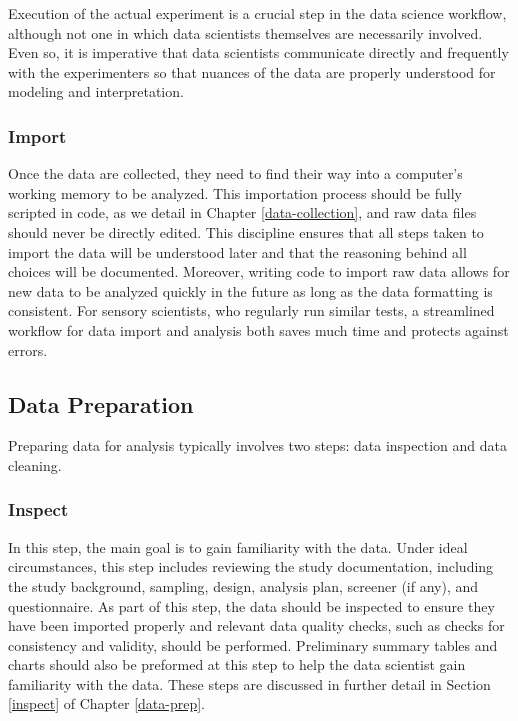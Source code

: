 \documentclass[
]{book}
\begin{document}
Execution of the actual experiment is a crucial step in the data science workflow, although not one in which data scientists themselves are necessarily involved. Even so, it is imperative that data scientists communicate directly and frequently with the experimenters so that nuances of the data are properly understood for modeling and interpretation.

\hypertarget{import}{%
\subsubsection{Import}\label{import}}

Once the data are collected, they need to find their way into a computer's working memory to be analyzed. This importation process should be fully scripted in code, as we detail in Chapter \ref{data-collection}, and raw data files should never be directly edited. This discipline ensures that all steps taken to import the data will be understood later and that the reasoning behind all choices will be documented. Moreover, writing code to import raw data allows for new data to be analyzed quickly in the future as long as the data formatting is consistent. For sensory scientists, who regularly run similar tests, a streamlined workflow for data import and analysis both saves much time and protects against errors.

\hypertarget{data-preparation}{%
\subsection{Data Preparation}\label{data-preparation}}

Preparing data for analysis typically involves two steps: data inspection and data cleaning.

\hypertarget{inspect_2}{%
\subsubsection{Inspect}\label{inspect_2}}

In this step, the main goal is to gain familiarity with the data. Under ideal circumstances, this step includes reviewing the study documentation, including the study background, sampling, design, analysis plan, screener (if any), and questionnaire. As part of this step, the data should be inspected to ensure they have been imported properly and relevant data quality checks, such as checks for consistency and validity, should be performed. Preliminary summary tables and charts should also be preformed at this step to help the data scientist gain familiarity with the data. These steps are discussed in further detail in Section \ref{inspect} of Chapter \ref{data-prep}.
\end{document}
